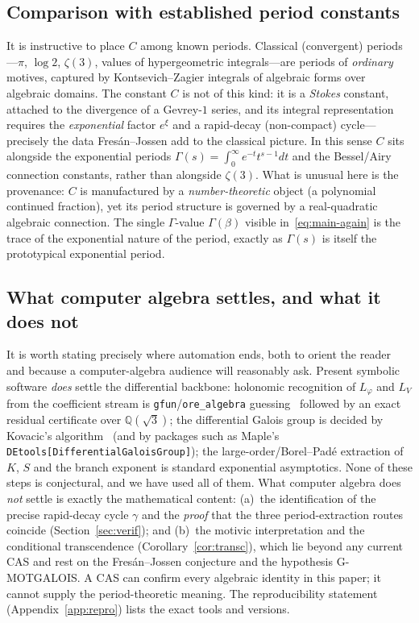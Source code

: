 \documentclass[11pt,reqno]{amsart}
\theoremstyle{plain}
\theoremstyle{definition}
\newcommand{\Lphi}{L_{\varphi}}
\newcommand{\LV}{L_{V}}
\newcommand{\Qsqrt}{\mathbb{Q}(\sqrt3)}
\providecommand{\C}{}\renewcommand{\C}{C}
\begin{document}
\subsection{Comparison with established period constants}
It is instructive to place $\C$ among known periods. Classical (convergent) periods---$\pi$,
$\log2$, $\zeta(3)$, values of hypergeometric integrals---are periods of \emph{ordinary} motives,
captured by Kontsevich--Zagier integrals of algebraic forms over algebraic domains. The constant
$\C$ is not of this kind: it is a \emph{Stokes} constant, attached to the divergence of a
Gevrey-$1$ series, and its integral representation requires the \emph{exponential} factor $e^{\xi}$
and a rapid-decay (non-compact) cycle---precisely the data Fres\'an--Jossen add to the classical
picture. In this sense $\C$ sits alongside the exponential periods $\Gamma(s)=\int_0^\infty
e^{-t}t^{s-1}dt$ and the Bessel/Airy connection constants, rather than alongside $\zeta(3)$. What
is unusual here is the provenance: $\C$ is manufactured by a \emph{number-theoretic} object (a
polynomial continued fraction), yet its period structure is governed by a real-quadratic
algebraic connection. The single $\Gamma$-value $\Gamma(\beta)$ visible
in~\eqref{eq:main-again} is the trace of the exponential nature of the period, exactly as
$\Gamma(s)$ is itself the prototypical exponential period.

\subsection{What computer algebra settles, and what it does not}
It is worth stating precisely where automation ends, both to orient the reader and because a
computer-algebra audience will reasonably ask. Present symbolic software \emph{does} settle the
differential backbone: holonomic recognition of $\Lphi$ and $\LV$ from the coefficient stream is
\texttt{gfun}/\texttt{ore\_algebra} guessing~\cite{gfun,oreAlgebra} followed by an exact residual
certificate over $\Qsqrt$; the differential Galois group is decided by Kovacic's
algorithm~\cite{Kovacic} (and by packages such as Maple's
\texttt{DEtools[DifferentialGaloisGroup]}); the large-order/Borel--Pad\'e extraction of $K$, $S$
and the branch exponent is standard exponential asymptotics. None of these steps is conjectural,
and we have used all of them. What computer algebra does \emph{not} settle is exactly the
mathematical content: (a)~the identification of the precise rapid-decay cycle $\gamma$ and the
\emph{proof} that the three period-extraction routes coincide (Section~\ref{sec:verif}); and
(b)~the motivic interpretation and the conditional transcendence
(Corollary~\ref{cor:transc}), which lie beyond any current CAS and rest on the Fres\'an--Jossen
conjecture and the hypothesis G-MOTGALOIS. A CAS can confirm every algebraic identity in this
paper; it cannot supply the period-theoretic meaning. The reproducibility statement
(Appendix~\ref{app:repro}) lists the exact tools and versions.
\end{document}
